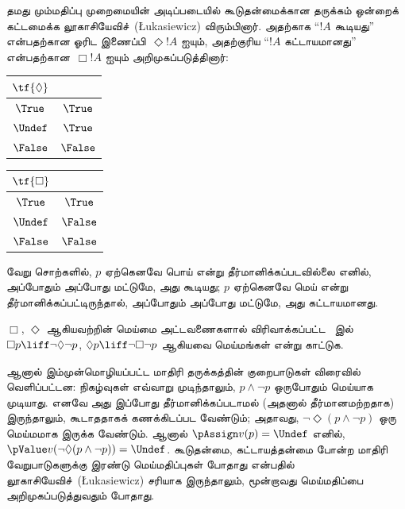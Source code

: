 \documentclass[../../../include/open-logic-section]{subfiles}
\begin{document}
தமது மும்மதிப்பு முறைமையின் அடிப்படையில் கூடுதன்மைக்கான தருக்கம் ஒன்றைக்
கட்டமைக்க லூகாசியேவிச்~(\L ukasiewicz) விரும்பினார். அதற்காக
``$!A$ கூடியது'' என்பதற்கான
ஓரிட இணைப்பி~$\Diamond !A$ ஐயும், அதற்குரிய ``$!A$ கட்டாயமானது''
என்பதற்கான~$\Box !A$ ஐயும் அறிமுகப்படுத்தினார்:
\begin{center}
  \begin{tabular}{c|c}
    $\tf{\Diamond}$ & \\
    \hline
    $\True$ & $\True$ \\
    $\Undef$ & $\True$ \\
    $\False$ & $\False$
  \end{tabular}
  \quad
  \begin{tabular}{c|c}
    $\tf{\Box}$ & \\
    \hline
    $\True$ & $\True$ \\
    $\Undef$ & $\False$ \\
    $\False$ & $\False$
  \end{tabular}
\end{center}
வேறு சொற்களில், $p$ ஏற்கெனவே பொய் என்று தீர்மானிக்கப்படவில்லை எனில்,
அப்போதும் அப்போது மட்டுமே, அது கூடியது; $p$ ஏற்கெனவே மெய் என்று
தீர்மானிக்கப்பட்டிருந்தால், அப்போதும் அப்போது மட்டுமே, அது கட்டாயமானது.

\begin{prob}
  $\Box$, $\Diamond$ ஆகியவற்றின் மெய்மை அட்டவணைகளால் விரிவாக்கப்பட்ட
  ~\LogLuk[3] இல் $\Box p \liff \lnot\Diamond \lnot p$, $\Diamond p \liff
  \lnot \Box \lnot p$ ஆகியவை மெய்மங்கள் என்று காட்டுக.
\end{prob}

ஆனால் இம்முன்மொழியப்பட்ட மாதிரி தருக்கத்தின் குறைபாடுகள் விரைவில்
வெளிப்பட்டன: நிகழ்வுகள் எவ்வாறு முடிந்தாலும், $p \land \lnot p$ ஒருபோதும்
மெய்யாக முடியாது. எனவே அது இப்போது தீர்மானிக்கப்படாமல் (அதனால்
தீர்மானமற்றதாக) இருந்தாலும், கூடாததாகக் கணக்கிடப்பட வேண்டும்; அதாவது,
$\lnot \Diamond(p \land \lnot p)$ ஒரு மெய்மமாக இருக்க வேண்டும். ஆனால்
$\pAssign v(p) = \Undef$ எனில்,
$\pValue v(\lnot \Diamond(p \land \lnot p)) = \Undef$. கூடுதன்மை,
கட்டாயத்தன்மை போன்ற மாதிரி வேறுபாடுகளுக்கு இரண்டு மெய்மதிப்புகள் போதாது
என்பதில் லூகாசியேவிச்~(\L ukasiewicz) சரியாக இருந்தாலும், மூன்றாவது மெய்மதிப்பை
அறிமுகப்படுத்துவதும் போதாது.
\end{document}
